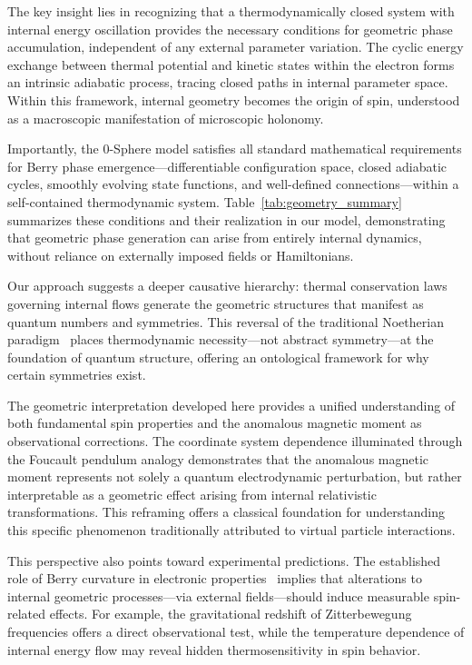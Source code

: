 \documentclass[%
 reprint,
 amsmath,amssymb,
 aps,
]{revtex4-1}
\numberwithin{equation}{section}%
\begin{document}
The key insight lies in recognizing that a thermodynamically closed system with internal energy oscillation provides the necessary conditions for geometric phase accumulation, independent of any external parameter variation. The cyclic energy exchange between thermal potential and kinetic states within the electron forms an intrinsic adiabatic process, tracing closed paths in internal parameter space. Within this framework, internal geometry becomes the origin of spin, understood as a macroscopic manifestation of microscopic holonomy.

Importantly, the 0-Sphere model satisfies all standard mathematical requirements for Berry phase emergence—differentiable configuration space, closed adiabatic cycles, smoothly evolving state functions, and well-defined connections—within a self-contained thermodynamic system. Table~\ref{tab:geometry_summary} summarizes these conditions and their realization in our model, demonstrating that geometric phase generation can arise from entirely internal dynamics, without reliance on externally imposed fields or Hamiltonians.

Our approach suggests a deeper causative hierarchy: thermal conservation laws governing internal flows generate the geometric structures that manifest as quantum numbers and symmetries. This reversal of the traditional Noetherian paradigm~\cite{hanamura2506.0119} places thermodynamic necessity—not abstract symmetry—at the foundation of quantum structure, offering an ontological framework for why certain symmetries exist.

The geometric interpretation developed here provides a unified understanding of both fundamental spin properties and the anomalous magnetic moment as observational corrections. The coordinate system dependence illuminated through the Foucault pendulum analogy demonstrates that the anomalous magnetic moment represents not solely a quantum electrodynamic perturbation, but rather interpretable as a geometric effect arising from internal relativistic transformations. This reframing offers a classical foundation for understanding this specific phenomenon traditionally attributed to virtual particle interactions.

This perspective also points toward experimental predictions. The established role of Berry curvature in electronic properties~\cite{xiao2010berry} implies that alterations to internal geometric processes—via external fields—should induce measurable spin-related effects. For example, the gravitational redshift of Zitterbewegung frequencies offers a direct observational test, while the temperature dependence of internal energy flow may reveal hidden thermosensitivity in spin behavior.
\end{document}
